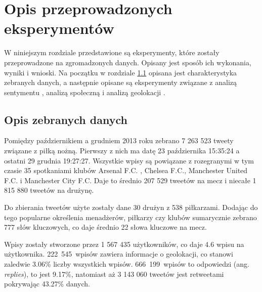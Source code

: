 \chapter{Opis przeprowadzonych eksperymentów}
\label{chapter:eksperymenty}
W niniejszym rozdziale przedstawione są eksperymenty, które zostały
przeprowadzone na zgromadzonych danych.
Opisany jest sposób ich wykonania, wyniki i wnioski.
Na początku w rozdziale \ref{section:opisdanych} opisana jest charakterystyka
zebranych danych, a następnie opisane są eksperymenty związane z analizą
sentymentu , analizą społeczną 
 i analizą geolokacji 
.














\section{Opis zebranych danych}
\label{section:opisdanych}

Pomiędzy październikiem a grudniem 2013 roku zebrano 7 263 523 tweety związane
z piłką nożną. Pierwszy z nich ma datę 23 października 15:35:24 a ostatni
29 grudnia 19:27:27. Wszystkie wpisy są powiązane z rozegranymi w tym czasie
35 spotkaniami klubów Arsenal F.C. , Chelsea F.C., Manchester United F.C. i
Manchester City F.C. Daje to średnio 207 529 tweetów na mecz i niecałe
1 815 880 tweetów na drużynę.

Do zbierania tweetów użyte zostały dane 30 drużyn z 538 piłkarzami.
Dodając do tego popularne określenia menadżerów, piłkarzy czy klubów sumarycznie
zebrano 777 słów kluczowych, co daje średnio 22 słowa kluczowe na mecz.

Wpisy zostały stworzone przez 1 567 435 użytkowników, co daje 4.6 
wpisu na użytkownika. \mbox{222 545 wpisów} zawiera informacje o geolokacji, co 
stanowi zaledwie 3.06\% liczby wszystkich wpisów. \mbox{666 199 wpisów} to 
odpowiedzi (ang. \textit{replies}), to jest 9.17\%, natomiast aż 3 143 060 
tweetów jest retweetami pokrywając 43.27\% danych.

